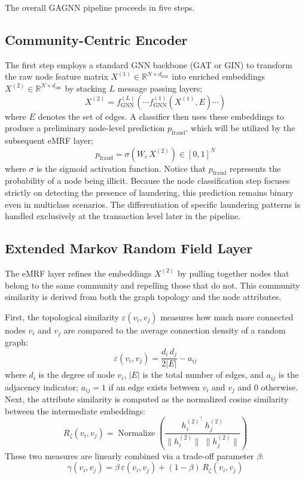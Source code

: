 The overall GAGNN pipeline proceeds in five steps.

\subsection{Community-Centric Encoder}
\label{sec:encoder}
The first step employs a standard GNN backbone (GAT or GIN) to transform the raw node feature matrix $X^{(1)} \in \mathbb{R}^{N \times d_{\text{feat}}}$ into enriched embeddings $X^{(2)} \in \mathbb{R}^{N \times d_{\text{out}}}$ by stacking $L$ message passing layers;
\begin{equation}
  X^{(2)} = f_{\text{GNN}}^{(L)}\!\left(\cdots f_{\text{GNN}}^{(1)}\!\left(X^{(1)}, E\right)\cdots\right)
\end{equation}
where $E$ denotes the set of edges. A classifier then uses these embeddings to produce a preliminary node-level prediction $p_{\text{fraud}}$, which will be utilized by the subsequent eMRF layer;
\begin{equation}
  p_{\text{fraud}} = \sigma\!\left(W_c\, X^{(2)}\right) \in [0,1]^{N}
\end{equation}
where $\sigma$ is the sigmoid activation function. Notice that $p_{\text{fraud}}$ represents the probability of a node being illicit. Because the node classification step focuses strictly on detecting the presence of laundering, this prediction remains binary even in multiclass scenarios. The differentiation of specific laundering patterns is handled exclusively at the transaction level later in the pipeline.

\subsection{Extended Markov Random Field Layer}
\label{sec:emrf}
The eMRF layer refines the embeddings $X^{(2)}$ by pulling together nodes that belong to the same community and repelling those that do not. This community similarity is derived from both the graph topology and the node attributes.

First, the topological similarity $\varepsilon(v_i, v_j)$ measures how much more connected nodes $v_i$ and $v_j$ are compared to the average connection density of a random graph:
\begin{equation}
  \varepsilon(v_i, v_j) = \frac{d_i\, d_j}{2|E|} - a_{ij}
\end{equation}
where $d_i$ is the degree of node $v_i$, $|E|$ is the total number of edges, and $a_{ij}$ is the adjacency indicator; $a_{ij} = 1$ if an edge exists between $v_i$ and $v_j$ and $0$ otherwise. Next, the attribute similarity is computed as the normalized cosine similarity between the intermediate embeddings:
\begin{equation}
  R_\zeta(v_i, v_j) = \operatorname{Normalize}\left( \frac{h_i^{(2)^\top}\, h_j^{(2)}}{\|h_i^{(2)}\|\;\|h_j^{(2)}\|} \right)
\end{equation}
These two measures are linearly combined via a trade-off parameter $\beta$:
\begin{equation}
  \gamma(v_i, v_j) = \beta\,\varepsilon(v_i, v_j) + (1 - \beta)\,R_\zeta(v_i, v_j)
\end{equation}

